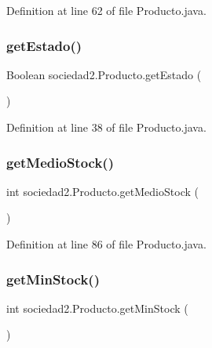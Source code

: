 Definition at line 62 of file Producto.\+java.

\mbox{\label{classsociedad2_1_1_producto_a60e7b61c9e1d4d0d1f57edee7871cadf}} 
\subsubsection{\texorpdfstring{get\+Estado()}{getEstado()}}
{\footnotesize\ttfamily Boolean sociedad2.\+Producto.\+get\+Estado (\begin{DoxyParamCaption}{ }\end{DoxyParamCaption})}



Definition at line 38 of file Producto.\+java.

\mbox{\label{classsociedad2_1_1_producto_ac31e436e0f5d5da61bf04ba4991cb6d3}} 
\subsubsection{\texorpdfstring{get\+Medio\+Stock()}{getMedioStock()}}
{\footnotesize\ttfamily int sociedad2.\+Producto.\+get\+Medio\+Stock (\begin{DoxyParamCaption}{ }\end{DoxyParamCaption})}



Definition at line 86 of file Producto.\+java.

\mbox{\label{classsociedad2_1_1_producto_a16f2c1f7840ee35473804385138ddeb8}} 
\subsubsection{\texorpdfstring{get\+Min\+Stock()}{getMinStock()}}
{\footnotesize\ttfamily int sociedad2.\+Producto.\+get\+Min\+Stock (\begin{DoxyParamCaption}{ }\end{DoxyParamCaption})}



